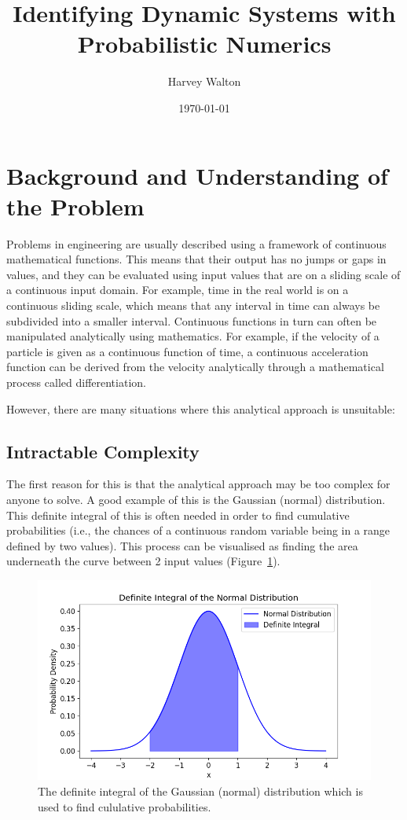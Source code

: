\documentclass[12pt]{article}
\title{Identifying Dynamic Systems with Probabilistic Numerics}
\author{Harvey Walton}
\date{\today}
\begin{document}

    \thispagestyle{empty}
    


    \tableofcontents
    \newpage


    \section{Background and Understanding of the Problem}


    Problems in engineering are usually described using a framework of continuous mathematical functions.
    This means that their output has no jumps or gaps in values, and they can be evaluated using input values that are on a sliding scale of a continuous input domain.
    For example, time in the real world is on a continuous sliding scale, which means that any interval in time can always be subdivided into a smaller interval.
    Continuous functions in turn can often be manipulated analytically using mathematics.
    For example, if the velocity of a particle is given as a continuous function of time, a continuous acceleration function can be derived from the velocity analytically through a mathematical process called differentiation.

    However, there are many situations where this analytical approach is unsuitable:

    \subsection{Intractable Complexity}

    The first reason for this is that the analytical approach may be too complex for anyone to solve.
    A good example of this is the Gaussian (normal) distribution.
    This definite integral of this is often needed in order to find cumulative probabilities (i.e., the chances of a continuous random variable being in a range defined by two values).
    This process can be visualised as finding the area underneath the curve between 2 input values (Figure~\ref{fig:ndi_}).

    \begin{figure}[H]
        \centering
        \includegraphics[width=0.8\linewidth]{figures/ndi/ndi_}
        \caption{The definite integral of the Gaussian (normal) distribution which is used to find cululative probabilities.}
        \label{fig:ndi_}
    \end{figure}
\end{document}

